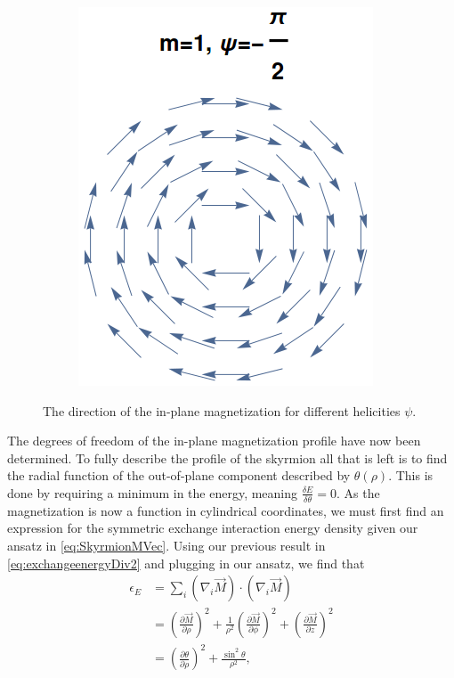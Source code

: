 \documentclass[12pt, a4paper, twoside, openright]{article}		%
\numberwithin{equation}{section}
\begin{document}
\begin{figure}[h!]
\begin{subfigure}{.49\textwidth}
  \caption{}
  \label{fig:m1psipi2}
\end{subfigure}
\begin{subfigure}{.49\textwidth}
  \centering
  \includegraphics[width=.6\linewidth]{Figures/m1psi-pi2.png}
  \caption{}
  \label{fig:m1psi-pi2}
\end{subfigure}
\caption{The direction of the in-plane magnetization for different helicities $\psi$. }
\label{fig:m_psi_shapes}
\end{figure}
The degrees of freedom of the in-plane magnetization profile have now been determined. To fully describe the profile of the skyrmion all that is left is to find the radial function of the out-of-plane component described by $\theta(\rho)$. This is done by requiring a minimum in the energy, meaning $\frac{\delta E}{\delta\theta} = 0$. As the magnetization is now a function in cylindrical coordinates, we must first find an expression for the symmetric exchange interaction energy density given our ansatz in \eqref{eq:SkyrmionMVec}. Using our previous result in \eqref{eq:exchangeenergyDiv2} and plugging in our ansatz, we find that
\begin{align}
\nonumber\epsilon_E &= \sum_i (\nabla_i\vec{M})\cdot(\nabla_i\vec{M}) \\
\nonumber&= \left(\frac{\partial \vec{M}}{\partial\rho}\right)^2+\frac{1}{\rho^2}\left(\frac{\partial\vec{M}}{\partial\phi}\right)^2+\left(\frac{\partial\vec{M}}{\partial z}\right)^2\\
&= \left(\frac{\partial \theta}{\partial\rho}\right)^2+\frac{\sin^2\theta}{\rho^2}, \label{eq:SymExchCylindrical}
\end{align}
\end{document}
